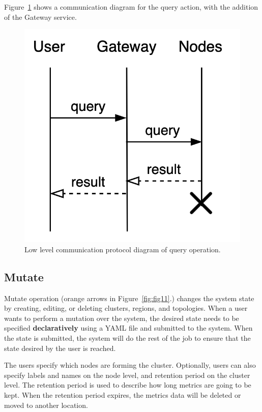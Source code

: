 Figure~\ref{fig:fig14} shows a communication diagram for the query action, with the addition of the Gateway service.

\begin{figure}[H]
	\begin{center}
		\includegraphics[scale=0.8]{images/Figure14}
	\end{center}
	\vspace{-0.7cm}
	\caption{Low level communication protocol diagram of query operation.}
	\label{fig:fig14}
\end{figure}
%
%
\subsection{Mutate}\label{sec:mutate} 
%
Mutate operation (orange arrows in Figure~\ref{fig:fig11}.) changes the system state by creating, editing, or deleting clusters, regions, and topologies. When a user wants to perform a mutation over the system, the desired state needs to be specified \textbf{declaratively} using a YAML file and submitted to the system. When the state is submitted, the system will do the rest of the job to ensure that the state desired by the user is reached.

The users specify which nodes are forming the cluster. Optionally, users can also specify labels and names on the node level, and retention period on the cluster level. The retention period is used to describe how long metrics are going to be kept. When the retention period expires, the metrics data will be deleted or moved to another location. 

